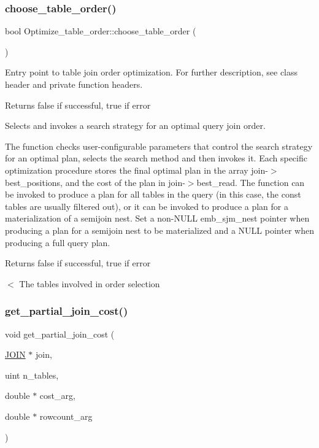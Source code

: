 \subsubsection{\texorpdfstring{choose\+\_\+table\+\_\+order()}{choose\_table\_order()}}
{\footnotesize\ttfamily bool Optimize\+\_\+table\+\_\+order\+::choose\+\_\+table\+\_\+order (\begin{DoxyParamCaption}{ }\end{DoxyParamCaption})}

Entry point to table join order optimization. For further description, see class header and private function headers.

\begin{DoxyReturn}{Returns}
false if successful, true if error
\end{DoxyReturn}
Selects and invokes a search strategy for an optimal query join order.

The function checks user-\/configurable parameters that control the search strategy for an optimal plan, selects the search method and then invokes it. Each specific optimization procedure stores the final optimal plan in the array \textquotesingle{}join-\/$>$best\+\_\+positions\textquotesingle{}, and the cost of the plan in \textquotesingle{}join-\/$>$best\+\_\+read\textquotesingle{}. The function can be invoked to produce a plan for all tables in the query (in this case, the const tables are usually filtered out), or it can be invoked to produce a plan for a materialization of a semijoin nest. Set a non-\/N\+U\+LL emb\+\_\+sjm\+\_\+nest pointer when producing a plan for a semijoin nest to be materialized and a N\+U\+LL pointer when producing a full query plan.

\begin{DoxyReturn}{Returns}
false if successful, true if error 
\end{DoxyReturn}
$<$ The tables involved in order selection \mbox{\label{group__Query__Planner_ga945145266f4a865c166692aea42818ed}} 
\subsubsection{\texorpdfstring{get\+\_\+partial\+\_\+join\+\_\+cost()}{get\_partial\_join\_cost()}}
{\footnotesize\ttfamily void get\+\_\+partial\+\_\+join\+\_\+cost (\begin{DoxyParamCaption}\item[{\mbox{\hyperlink{classJOIN}{J\+O\+IN}} $\ast$}]{join,  }\item[{uint}]{n\+\_\+tables,  }\item[{double $\ast$}]{cost\+\_\+arg,  }\item[{double $\ast$}]{rowcount\+\_\+arg }\end{DoxyParamCaption})}

